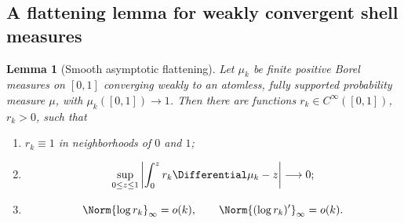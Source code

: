 \documentclass[11pt]{article}
\newtheorem{lemma}[theorem]{Lemma}
\theoremstyle{definition}
\theoremstyle{remark}
\begin{document}
\subsection{A flattening lemma for weakly convergent shell measures}

\begin{lemma}[Smooth asymptotic flattening]
\label{lem:flattening}
Let \(\mu_k\) be finite positive Borel measures on \([0,1]\) converging weakly
to an atomless, fully supported probability measure \(\mu\), with
\(\mu_k([0,1])\to1\).  Then there are functions
\(r_k\in C^\infty([0,1])\), \(r_k>0\), such that
\begin{enumerate}[label=\textup{(\alph*)}]
\item \(r_k\equiv1\) in neighborhoods of \(0\) and \(1\);
\item
\begin{equation}
 \sup_{0\le z\le1}
 \left|\int_0^zr_k\Differential\mu_k-z\right|\longrightarrow0;
 \label{eq:flattening-cdf}
\end{equation}
\item
\begin{equation}
 \Norm{\log r_k}_\infty=o(k),
 \qquad
 \Norm{(\log r_k)'}_\infty=o(k).
 \label{eq:flattening-slopes}
\end{equation}
\end{enumerate}
\end{lemma}
\end{document}
